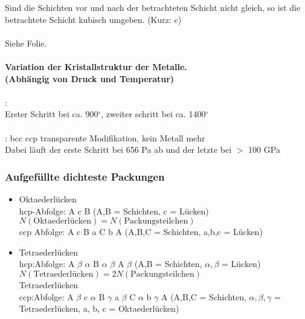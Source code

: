 \documentclass[a4paper, 12pt]{article}
\begin{document}
Sind die Schichten vor und nach der betrachteten Schicht nicht gleich, so ist die betrachtete Schicht kubisch umgeben. (Kurz: c)\\\\
Siehe Folie.\\\\
\textbf{Variation der Kristallstruktur der Metalle.\\(Abhängig von Druck und Temperatur)}\\\\
: \\
Erster Schritt bei ca. 900$^\circ$, zweiter schritt bei ca. 1400$^\circ$\\\\
: bcc \ce{->} ccp \ce{-> -> ->} transparente Modifikation, kein Metall mehr\\
Dabei läuft der erste Schritt bei 656 Pa ab und der letzte bei $>$ 100 GPa
\subsubsection{Aufgefüllte dichteste Packungen}
\begin{itemize}
    \item Oktaederlücken\\hcp-Abfolge: A c B (A,B = Schichten, c = Lücken)\\$N(\mathrm{Oktaederl\text{ü}cken})=N(\mathrm{Packungsteilchen})$\\
            ccp Abfolge: A c B a C b A (A,B,C = Schichten, a,b,c = Lücken)
    \item Tetraederlücken\\hcp:Abfolge: A $\beta$ $\alpha$ B $\alpha$ $\beta$ A $\beta$ (A,B = Schichten, $\alpha, \beta$ = Lücken)\\$N(\mathrm{Tetraederl\text{ü}cken})=2N(\mathrm{Packungsteilchen})$\\Tetraederlücken\\
            ccp:Abfolge: A $\beta$ c $\alpha$ B $\gamma$ a $\beta$ C $\alpha$ b $\gamma$ A (A,B,C = Schichten, $\alpha, \beta, \gamma$ = Tetraederlücken, a, b, c = Oktaederlücken)
\end{itemize}
\end{document}

